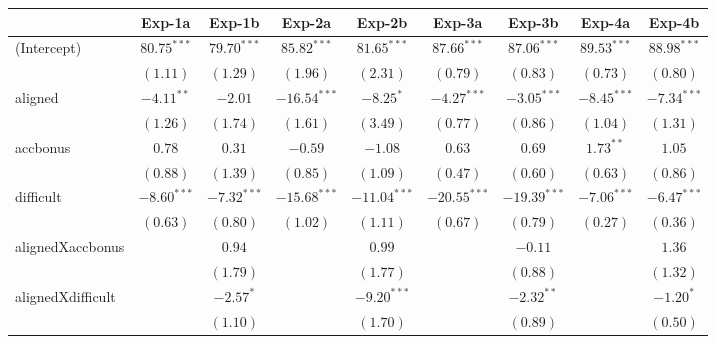 
\begin{table}
\begin{center}
\begin{tabular}{l c c c c c c c c}
\hline
 & Exp-1a & Exp-1b & Exp-2a & Exp-2b & Exp-3a & Exp-3b & Exp-4a & Exp-4b \\
\hline
(Intercept)             & $80.75^{***}$ & $79.70^{***}$ & $85.82^{***}$  & $81.65^{***}$  & $87.66^{***}$  & $87.06^{***}$  & $89.53^{***}$ & $88.98^{***}$ \\
                        & $(1.11)$      & $(1.29)$      & $(1.96)$       & $(2.31)$       & $(0.79)$       & $(0.83)$       & $(0.73)$      & $(0.80)$      \\
aligned                 & $-4.11^{**}$  & $-2.01$       & $-16.54^{***}$ & $-8.25^{*}$    & $-4.27^{***}$  & $-3.05^{***}$  & $-8.45^{***}$ & $-7.34^{***}$ \\
                        & $(1.26)$      & $(1.74)$      & $(1.61)$       & $(3.49)$       & $(0.77)$       & $(0.86)$       & $(1.04)$      & $(1.31)$      \\
accbonus                & $0.78$        & $0.31$        & $-0.59$        & $-1.08$        & $0.63$         & $0.69$         & $1.73^{**}$   & $1.05$        \\
                        & $(0.88)$      & $(1.39)$      & $(0.85)$       & $(1.09)$       & $(0.47)$       & $(0.60)$       & $(0.63)$      & $(0.86)$      \\
difficult               & $-8.60^{***}$ & $-7.32^{***}$ & $-15.68^{***}$ & $-11.04^{***}$ & $-20.55^{***}$ & $-19.39^{***}$ & $-7.06^{***}$ & $-6.47^{***}$ \\
                        & $(0.63)$      & $(0.80)$      & $(1.02)$       & $(1.11)$       & $(0.67)$       & $(0.79)$       & $(0.27)$      & $(0.36)$      \\
alignedXaccbonus        &               & $0.94$        &                & $0.99$         &                & $-0.11$        &               & $1.36$        \\
                        &               & $(1.79)$      &                & $(1.77)$       &                & $(0.88)$       &               & $(1.32)$      \\
alignedXdifficult       &               & $-2.57^{*}$   &                & $-9.20^{***}$  &                & $-2.32^{**}$   &               & $-1.20^{*}$   \\
                        &               & $(1.10)$      &                & $(1.70)$       &                & $(0.89)$       &               & $(0.50)$      \\

\end{tabular}
\end{center}
\end{table}
